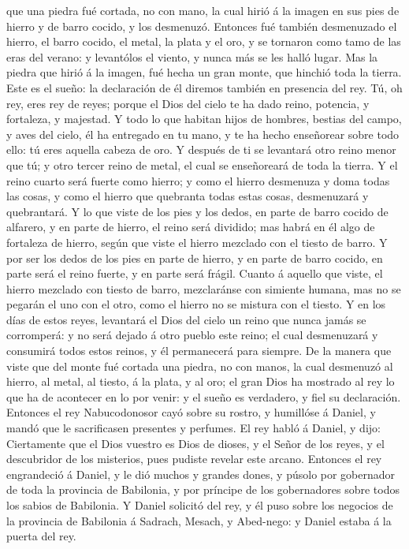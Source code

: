 que una piedra fué cortada, no con mano, la cual hirió á la imagen en
sus pies de hierro y de barro cocido, y los desmenuzó. 
Entonces fué también desmenuzado el hierro, el barro cocido, el metal,
la plata y el oro, y se tornaron como tamo de las eras del verano: y
levantólos el viento, y nunca más se les halló lugar. Mas la piedra que
hirió á la imagen, fué hecha un gran monte, que hinchió toda la tierra.
 Este es el sueño: la declaración de él diremos también en
presencia del rey.  Tú, oh rey, eres rey de reyes; porque
el Dios del cielo te ha dado reino, potencia, y fortaleza, y majestad.
 Y todo lo que habitan hijos de hombres, bestias del campo,
y aves del cielo, él ha entregado en tu mano, y te ha hecho enseñorear
sobre todo ello: tú eres aquella cabeza de oro.  Y después
de ti se levantará otro reino menor que tú; y otro tercer reino de
metal, el cual se enseñoreará de toda la tierra.  Y el
reino cuarto será fuerte como hierro; y como el hierro desmenuza y doma
todas las cosas, y como el hierro que quebranta todas estas cosas,
desmenuzará y quebrantará.  Y lo que viste de los pies y
los dedos, en parte de barro cocido de alfarero, y en parte de hierro,
el reino será dividido; mas habrá en él algo de fortaleza de hierro,
según que viste el hierro mezclado con el tiesto de barro. 
Y por ser los dedos de los pies en parte de hierro, y en parte de barro
cocido, en parte será el reino fuerte, y en parte será frágil.
 Cuanto á aquello que viste, el hierro mezclado con tiesto
de barro, mezclaránse con simiente humana, mas no se pegarán el uno con
el otro, como el hierro no se mistura con el tiesto.  Y en
los días de estos reyes, levantará el Dios del cielo un reino que nunca
jamás se corromperá: y no será dejado á otro pueblo este reino; el cual
desmenuzará y consumirá todos estos reinos, y él permanecerá para
siempre.  De la manera que viste que del monte fué cortada
una piedra, no con manos, la cual desmenuzó al hierro, al metal, al
tiesto, á la plata, y al oro; el gran Dios ha mostrado al rey lo que ha
de acontecer en lo por venir: y el sueño es verdadero, y fiel su
declaración.  Entonces el rey Nabucodonosor cayó sobre su
rostro, y humillóse á Daniel, y mandó que le sacrificasen presentes y
perfumes.  El rey habló á Daniel, y dijo: Ciertamente que
el Dios vuestro es Dios de dioses, y el Señor de los reyes, y el
descubridor de los misterios, pues pudiste revelar este arcano.
 Entonces el rey engrandeció á Daniel, y le dió muchos y
grandes dones, y púsolo por gobernador de toda la provincia de
Babilonia, y por príncipe de los gobernadores sobre todos los sabios de
Babilonia.  Y Daniel solicitó del rey, y él puso sobre los
negocios de la provincia de Babilonia á Sadrach, Mesach, y Abed-nego: y
Daniel estaba á la puerta del rey.

